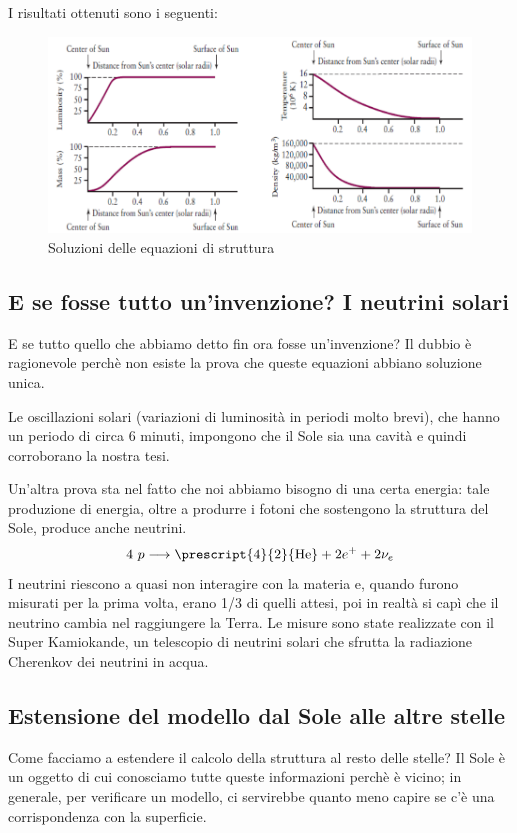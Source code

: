 \documentclass[a4paper,11pt]{article}
\begin{document}
I risultati ottenuti sono i seguenti:
\begin{figure}[h!]
    \centering
    \includegraphics[scale=0.7]{soluzioni.png}
    \caption{Soluzioni delle equazioni di struttura}
\end{figure}
\subsection{E se fosse tutto un'invenzione? I neutrini solari}
E se tutto quello che abbiamo detto fin ora fosse un'invenzione? Il dubbio è ragionevole perchè non esiste la prova che queste equazioni abbiano soluzione unica.

Le oscillazioni solari (variazioni di luminosità in periodi molto brevi), che hanno un periodo di circa 6 minuti, impongono che il Sole sia una cavità e quindi corroborano la nostra tesi.

Un'altra prova sta nel fatto che noi abbiamo bisogno di una certa energia: tale produzione di energia, oltre a produrre i fotoni che sostengono la struttura del Sole, produce anche neutrini.
$$4\ p\longrightarrow \prescript{4}{2}{\text{He}}+2e^++2\nu_e$$
I neutrini riescono a quasi non interagire con la materia e, quando furono misurati per la prima volta, erano 1/3 di quelli attesi, poi in realtà si capì che il neutrino cambia nel raggiungere la Terra. Le misure sono state realizzate con il Super Kamiokande, un telescopio di neutrini solari che sfrutta la radiazione Cherenkov dei neutrini in acqua.

\subsection{Estensione del modello dal Sole alle altre stelle}
Come facciamo a estendere il calcolo della struttura al resto delle stelle? Il Sole è un oggetto di cui conosciamo tutte queste informazioni perchè è vicino; in generale, per verificare un modello, ci servirebbe quanto meno capire se c'è una corrispondenza con la superficie.
\end{document}
